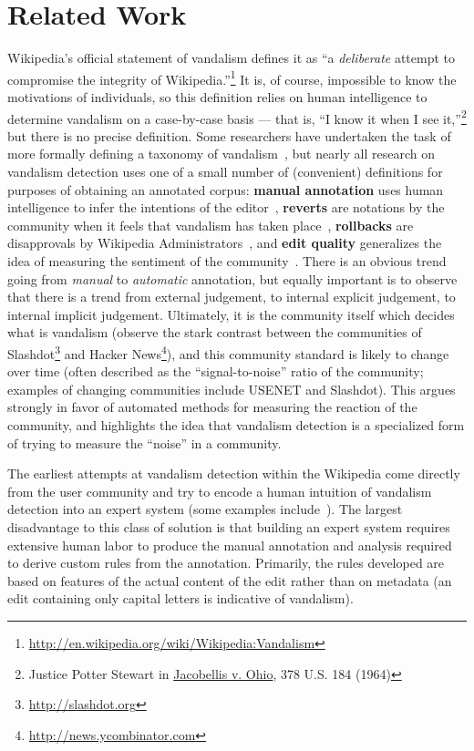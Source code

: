 \section{Related Work}
\label{sec:vandalism-related}

Wikipedia's official statement of vandalism defines it as
``a \textit{deliberate} attempt to compromise the integrity
of Wikipedia.''\footnote{
\url{http://en.wikipedia.org/wiki/Wikipedia:Vandalism}}
It is, of course, impossible to know the motivations of individuals,
so this definition relies on human intelligence to determine
vandalism on a case-by-case basis --- that is, ``I know it
when I see it,''\footnote{Justice Potter Stewart in
\underline{Jacobellis v. Ohio}, 378 U.S. 184 (1964)}
but there is no precise definition.
Some researchers have undertaken the task of more formally defining a
taxonomy of vandalism~\cite{Viegas2004,Priedhorsky2007,Chin2010},
but nearly all research on vandalism detection uses one of a small
number of (convenient) definitions for purposes of obtaining an
annotated corpus: \textbf{manual annotation} uses human intelligence
to infer the intentions of the
editor~\cite{Potthast2008,Chin2010,West2010,Potthast2010a},
\textbf{reverts} are notations by the community when it feels that
vandalism has taken place~\cite{Smets2008,Itakura2009,Belani2010},
\textbf{rollbacks} are disapprovals by Wikipedia
Administrators~\cite{West2010},
and \textbf{edit quality} generalizes the idea of measuring the
sentiment of the community~\cite{Adler2007,Druck2008}.
There is an obvious trend going from \textit{manual} to
\textit{automatic} annotation, but equally important is to observe
that there is a trend from external judgement, to internal explicit
judgement, to internal implicit judgement.
Ultimately, it is the community itself which decides what is
vandalism (\eg observe the stark contrast between the communities of
Slashdot\footnote{\url{http://slashdot.org}} and
Hacker News\footnote{\url{http://news.ycombinator.com}}),
and this community standard is likely to change over time
(often described as the ``signal-to-noise'' ratio of the community;
examples of changing communities include USENET and Slashdot).
This argues strongly in favor of automated methods for measuring
the reaction of the community, and highlights the idea that vandalism
detection is a specialized form of trying to measure the ``noise'' in
a community.

The earliest attempts at vandalism detection within the Wikipedia come
directly from the user community and try to encode a human intuition
of vandalism detection into an expert system (some examples
include~\cite{wiki:AntiVandalBot,wiki:MartinBot,wiki:ClueBot,Carter2007}).
The largest disadvantage to this class of solution is that building
an expert system requires extensive human labor to produce the manual
annotation and analysis required to derive custom rules from the
annotation.
Primarily, the rules developed are based on features of the actual
content of the edit rather than on metadata (\eg an edit containing
only capital letters is indicative of vandalism).

